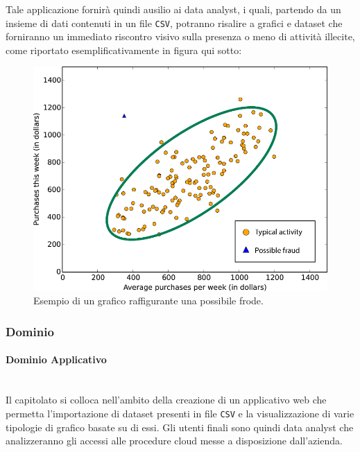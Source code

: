 \documentclass[11pt]{article}
\begin{document}
    Tale applicazione fornirà quindi ausilio ai data analyst, i quali, partendo da un insieme di dati contenuti in un file
    \texttt{CSV}, potranno risalire a grafici e dataset che forniranno un immediato riscontro visivo sulla presenza o meno di attività
    illecite, come riportato esemplificativamente in figura qui sotto:
    
    \bigskip
    
    \begin{figure}[h!]
        \centering
        \includegraphics[scale=0.4]{Res/LoginWarrior.png}
        \caption{Esempio di un grafico raffigurante una possibile frode.}
        \label{zucchetti}
    \end{figure}
    
    \subsubsection{Dominio}
        \paragraph{Dominio Applicativo}~\\
        
        \noindent
        Il capitolato si colloca nell'ambito della creazione di un applicativo web che permetta l'importazione di dataset presenti in
        file \texttt{CSV} e la visualizzazione di varie tipologie di grafico basate su di essi.
        Gli utenti finali sono quindi data analyst che analizzeranno gli accessi alle procedure cloud messe a disposizione dall'azienda.
        
\end{document}
